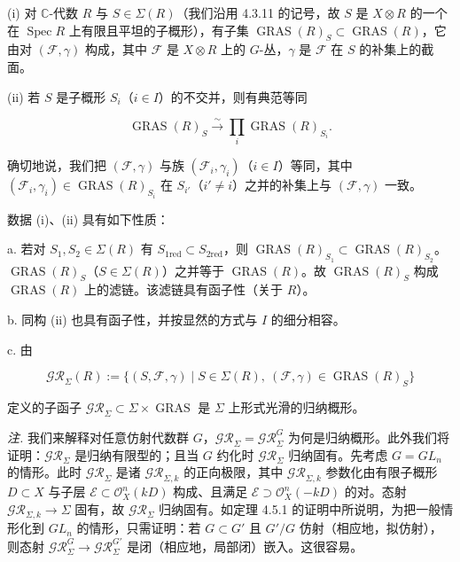 
(i) 对 $\mathbb{C}$-代数 $R$ 与 $S\in\Sigma(R)$（我们沿用 4.3.11 的记号，故 $S$ 是 $X\otimes R$ 的一个在 $\operatorname{Spec}R$ 上有限且平坦的子概形），有子集 $\operatorname{GRAS}(R)_S\subset\operatorname{GRAS}(R)$，它由对 $(\mathcal{F},\gamma)$ 构成，其中 $\mathcal{F}$ 是 $X\otimes R$ 上的 $G$-丛，$\gamma$ 是 $\mathcal{F}$ 在 $S$ 的补集上的截面。

(ii) 若 $S$ 是子概形 $S_i$（$i\in I$）的不交并，则有典范等同

\begin{equation}\tag{262}
\operatorname{GRAS}(R)_S\xrightarrow{\sim}\prod_i\operatorname{GRAS}(R)_{S_i}.
\end{equation}

确切地说，我们把 $(\mathcal{F},\gamma)$ 与族 $(\mathcal{F}_i,\gamma_i)$（$i\in I$）等同，其中 $(\mathcal{F}_i,\gamma_i)\in\operatorname{GRAS}(R)_{S_i}$ 在 $S_{i'}$（$i'\neq i$）之并的补集上与 $(\mathcal{F},\gamma)$ 一致。

数据 (i)、(ii) 具有如下性质：

a. 若对 $S_1,S_2\in\Sigma(R)$ 有 $S_{1\mathrm{red}}\subset S_{2\mathrm{red}}$，则 $\operatorname{GRAS}(R)_{S_1}\subset\operatorname{GRAS}(R)_{S_2}$。$\operatorname{GRAS}(R)_S$（$S\in\Sigma(R)$）之并等于 $\operatorname{GRAS}(R)$。故 $\operatorname{GRAS}(R)_S$ 构成 $\operatorname{GRAS}(R)$ 上的滤链。该滤链具有函子性（关于 $R$）。

b. 同构 (ii) 也具有函子性，并按显然的方式与 $I$ 的细分相容。

c. 由

\[
\mathcal{GR}_\Sigma(R):=\{(S,\mathcal{F},\gamma)\mid S\in\Sigma(R),\ (\mathcal{F},\gamma)\in\operatorname{GRAS}(R)_S\}
\]

定义的子函子 $\mathcal{GR}_\Sigma\subset\Sigma\times\operatorname{GRAS}$ 是 $\Sigma$ 上形式光滑的归纳概形。

\emph{注.} 我们来解释对任意仿射代数群 $G$，$\mathcal{GR}_\Sigma=\mathcal{GR}^{G}_\Sigma$ 为何是归纳概形。此外我们将证明：$\mathcal{GR}_\Sigma$ 是归纳有限型的；且当 $G$ 约化时 $\mathcal{GR}_\Sigma$ 归纳固有。先考虑 $G=GL_n$ 的情形。此时 $\mathcal{GR}_\Sigma$ 是诸 $\mathcal{GR}_{\Sigma,k}$ 的正向极限，其中 $\mathcal{GR}_{\Sigma,k}$ 参数化由有限子概形 $D\subset X$ 与子层 $\mathcal{E}\subset\mathcal{O}_X^{n}(kD)$ 构成、且满足 $\mathcal{E}\supset\mathcal{O}_X^{n}(-kD)$ 的对。态射 $\mathcal{GR}_{\Sigma,k}\to\Sigma$ 固有，故 $\mathcal{GR}_\Sigma$ 归纳固有。如定理 4.5.1 的证明中所说明，为把一般情形化到 $GL_n$ 的情形，只需证明：若 $G\subset G'$ 且 $G'/G$ 仿射（相应地，拟仿射），则态射 $\mathcal{GR}^{G}_\Sigma\to\mathcal{GR}^{G'}_\Sigma$ 是闭（相应地，局部闭）嵌入。这很容易。

